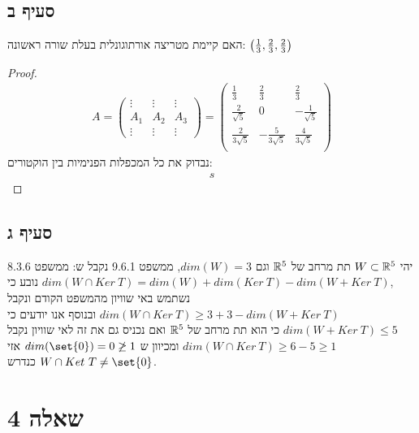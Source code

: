 \documentclass{article}
\DeclarePairedDelimiter\set\{\}
\begin{document}
	\subsection*{סעיף ב}
	האם קיימת מטריצה אורתוגונלית בעלת שורה ראשונה: $\left( \frac{1}{3}, \frac{2}{3}, \frac{2}{3} \right)$
	\begin{proof}
		\begin{align*}
			A = \begin{pmatrix}
					\vdots & \vdots & \vdots \\
					A_1 & A_2 & A_3 \\
					\vdots & \vdots & \vdots
			\end{pmatrix} =
			\begin{pmatrix}
					\frac{1}{3} & \frac{2}{3} & \frac{2}{3} \\
					\frac{2}{\sqrt{5}} & 0 & -\frac{1}{\sqrt{5}} \\
					\frac{2}{3\sqrt{5}} & - \frac{5}{3\sqrt{5}} & \frac{4}{3\sqrt{5}} \\
				\end{pmatrix}
		\end{align*}
		נבדוק את כל המכפלות הפנימיות בין הוקטורים:
		\begin{align*}
			s
		\end{align*}
	\end{proof}
	\subsection*{סעיף ג}
	יהי $W \subset \mathbb{R}^5$ תת מרחב של $\mathbb{R}^5$ וגם $dim(W) = 3$, ממשפט 9.6.1 נקבל ש:
	ממשפט 8.3.6 נובע כי $dim(W \cap Ker \ T) = dim(W) + dim(Ker \ T) - dim(W + Ker \ T)$, \\
	נשתמש באי שוויון מהמשפט הקודם ונקבל $dim(W \cap Ker \ T) \geq 3 + 3 - dim(W + Ker \ T)$
	ובנוסף אנו יודעים כי $dim(W + Ker \ T) \leq 5$ כי הוא תת מרחב של $\mathbb{R}^5$ ואם נכניס גם את זה לאי שוויון נקבל $dim(W \cap Ker \ T) \geq 6 -5 \geq 1$
	ומכיוון ש $dim(\set{0}) = 0 \not \geq 1$ אזי $W \cap Ket \ T \neq \set{0}$ כנדרש.

	\pagebreak
	\section*{שאלה 4}
\end{document}
